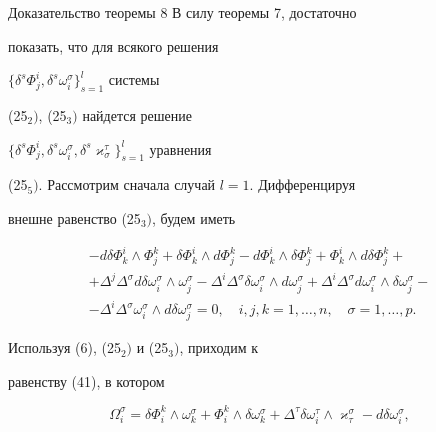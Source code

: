 




\begin{pf*}{Доказательство теоремы 8} В силу теоремы 7, достаточно


показать, что для всякого решения


$\{\delta^s\Phi^i_j,\delta^s\omega^{\sigma}_i\}_{s=1}^l$ системы


(25${}_2)$, (25${}_3)$ найдется решение


$\{\delta^s\Phi^i_j,\delta^s\omega^{\sigma}_i,


\delta^s\varkappa^{\tau}_{\sigma}\}_{s=1}^l$ уравнения


(25${}_5)$. Рассмотрим сначала случай $l=1$. Дифференцируя


внешне равенство (25${}_3)$, будем иметь


\begin{gather*}


-d\delta\Phi^i_k\wedge\Phi^k_j+\delta\Phi^i_k\wedge d\Phi^k_j-


d\Phi^i_k\wedge\delta\Phi^k_j+\Phi^i_k\wedge d\delta\Phi^k_j+\\


+\Delta^j\Delta^{\sigma}d\delta\omega^{\sigma}_i\wedge


\omega^{\sigma}_j


-\Delta^i\Delta^{\sigma}\delta\omega^{\sigma}_i\wedge


d\omega^{\sigma}_j+\Delta^i\Delta^{\sigma} d\omega^{\sigma}_i


\wedge\delta\omega^{\sigma}_j-\\


-\Delta^i\Delta^{\sigma}


\omega^{\sigma}_i\wedge d\delta\omega^{\sigma}_j=0,\quad


i,j,k=1,\dotsc,n,\quad \sigma=1,\dotsc,p.


\end{gather*}


Используя (6), (25${}_2)$ и (25${}_3)$, приходим к


равенству (41), в котором


\begin{equation}


\Omega^{\sigma}_i=\delta\Phi^k_i\wedge\omega^{\sigma}_k+


\Phi^k_i\wedge\delta\omega^{\sigma}_k+


\Delta^{\tau}\delta\omega^{\tau}_i\wedge\varkappa^{\sigma}_{\tau}-


d\delta\omega^{\sigma}_i,



\end{equation}
\end{pf*}
